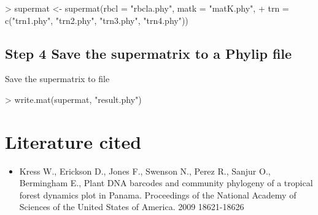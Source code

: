 \documentclass[12pt]{article}
\begin{document}
\begin{Schunk}
\begin{Sinput}
> supermat <- supermat(rbcl = "rbcla.phy", matk = "matK.phy", 
+     trn = c("trn1.phy", "trn2.phy", "trn3.phy", "trn4.phy"))
\end{Sinput}
\end{Schunk}
	  
\subsection{Step 4 Save the supermatrix to a Phylip file}
Save the supermatrix to file 

\begin{Schunk}
\begin{Sinput}
> write.mat(supermat, "result.phy")
\end{Sinput}
\end{Schunk}

\section{Literature cited}

\begin{itemize}
\item{Kress W., Erickson D., Jones F., Swenson N., Perez R., Sanjur O., Bermingham E., Plant DNA barcodes and community phylogeny of a tropical forest dynamics plot in Panama. Proceedings of the National Academy of Sciences of the United States of America. 2009 18621-18626 }
\end{itemize}
\end{document}
